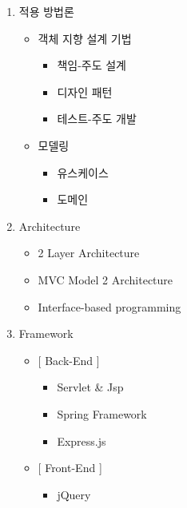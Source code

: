 \newpage


\begin{enumerate}
    \item 적용 방법론
        \begin{itemize}
            \item 객체 지향 설계 기법
                \begin{itemize}
                    \item[] 책임-주도 설계
                    \item[] 디자인 패턴
                    \item[] 테스트-주도 개발
                \end{itemize}
        \end{itemize}
        \begin{itemize}
            \item 모델링
                \begin{itemize}
                    \item[] 유스케이스
                    \item[] 도메인
                \end{itemize}
        \end{itemize}
    \item Architecture
        \begin{itemize}
            \item 2 Layer Architecture
            \item MVC Model 2 Architecture
            \item Interface-based programming
        \end{itemize}
    \item Framework
        \begin{itemize}
            \item{} [ Back-End ]
                \begin{itemize}
                    \item[] Servlet \& Jsp
                    \item[] Spring Framework
                    \item[] Express.js
                \end{itemize}
            \item{} [ Front-End ]
                \begin{itemize}
                    \item[] jQuery

\end{itemize}
\end{itemize}
\end{enumerate}
